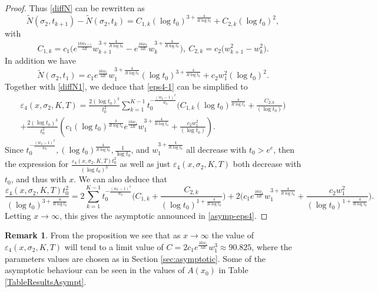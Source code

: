 \documentclass[10pt]{amsart}
\newcommand{\s}{\sigma}
\theoremstyle{definition}
\newtheorem{Rem}[prop]{Remark}
\numberwithin{equation}{section}
\begin{document}
\begin{proof}
Thus \eqref{diffN} can be rewritten as  
\begin{equation}\label{diffN1}
\tilde{N}(\s_2, t_{k+1}) - \tilde{N}(\s_2, t_{k}) 
= 
C_{1,k} (\log t_0)^{3+\frac{4}{R\log t_0}}
+ C_{2,k}  (\log t_0)^{2},
\end{equation}
with
\begin{equation}
C_{1,k} = c_1   \Big( e^{\frac{16w_{k+1}}{3 R} } w_{k+1}^{3+\frac{4}{R\log t_0}} -  e^{\frac{16w_k}{3 R } }  w_k ^{3+\frac{4}{R\log t_0}}\Big) ,\  
C_{2,k}= c_2 \big(w_{k+1}^2 - w_{k}^2\big).
\end{equation}
In addition we have
\[
\tilde{N}(\s_2, t_{1}) 
= 
c_1e^{\frac{16w_{1} }{3 R} }w_1^{3+\frac{4}{R\log t_0}}  (\log t_0)^{3+\frac{4}{R\log t_0}} 
+ c_2 w_{1}^2 (\log  t_0)^2 .
\]
Together with \eqref{diffN1}, we deduce that \eqref{eps4-1} can be simplified to
\begin{multline}\label{eps4-2}
\varepsilon_4(x,\s_2,K,T) =
 \frac{2(\log t_0)^3}{t_0^2} \sum_{k=1}^{K-1} t_0^{ - \frac{(w_k-1)^2}{w_k} } 
\Big( C_{1,k} (\log t_0)^{\frac{4}{R\log t_0}}
+ \frac{C_{2,k}}{  (\log t_0) } \Big)  
\\ +\frac{2(\log t_0)^3}{t_0^2} \left(c_1 (\log t_0)^{ \frac{4}{R\log t_0}} e^{\frac{16w_{1}}{3 R} } w_{1}^{3+\frac{4}{R\log t_0}}
+ \frac{ c_2w_{1}^2 }{  (\log t_0) }  
\right).
\end{multline}
Since $ t_0^{ - \frac{(w_k-1)^2}{w_k} } , (\log t_0)^{\frac{4}{R \log t_0}} , \frac1{\log t_0}$, and $w_{1}^{3+\frac{4}{R\log t_0}}$ all decrease with $t_0>e^e$, then the expression for 
$\frac{\varepsilon_4(x,\s_2,K,T) t_0^2}{(\log t_0)^3}$ as well as just $ \varepsilon_4(x,\s_2,K,T) $ both decrease with $t_0$, and thus with $x$.
%
We can also deduce that
\[
\frac{\varepsilon_4(x,\s_2,K,T) t_0^2}{(\log t_0)^{3+\frac{4}{R\log t_0}}}=
 2   \sum_{k=1}^{K-1} t_0^{ - \frac{(w_k-1)^2}{w_k} } 
\Big( C_{1,k} 
+\frac{ C_{2,k} }{ (\log t_0)^{1+\frac{4}{R\log t_0}} }\Big)  
 +2\Big(c_1   e^{\frac{16w_{1}}{3 R} } w_{1}^{3+\frac{4}{R\log t_0}}
+  \frac{c_2w_{1}^2 }{ (\log t_0)^{1+\frac{4}{R\log t_0}} }\Big).
\]
Letting $x\to \infty$, this gives the asymptotic announced in \eqref{asymp-eps4}.
\end{proof}

\begin{Rem}
From the proposition we see that as $x\to\infty$ the value of $\varepsilon_4(x,\s_2,K,T) $ will tend to a limit value of $C = 2 c_1   e^{\frac{16w_{1}}{3 R} } w_{1}^{3}\approx90.825$, where the parameters values are chosen as in Section \ref{sec:asymptotic}.
Some of the asymptotic behaviour can be seen in the values of $A(x_0)$ in Table \ref{TableResultsAsympt}.
\end{Rem}
\end{document}
